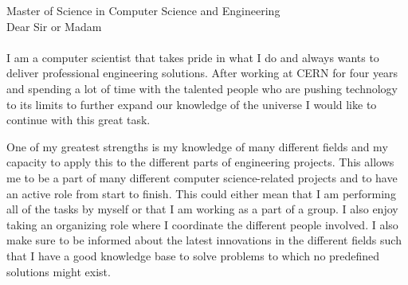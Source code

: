 \documentclass[left=2.5cm,top=2cm,right=2.5cm,bottom=2.5cm]{cv-style}
\begin{document}
       {Master of Science in Computer Science and Engineering}        %
\vspace{10mm}
\\
Dear Sir or Madam
\\
\\
I am a computer scientist that takes pride in what I do and always wants to deliver professional engineering solutions. After working at CERN for four years and spending a lot of time with the talented people who are pushing technology to its limits to further expand our knowledge of the universe I would like to continue with this great task.

One of my greatest strengths is my knowledge of many different fields and my capacity to apply this to the different parts of engineering projects. This allows me to be a part of many different computer science-related projects and to have an active role from start to finish. This could either mean that I am performing all of the tasks by myself or that I am working as a part of a group. I also enjoy taking an organizing role where I coordinate the different people involved. I also make sure to be informed about the latest innovations in the different fields such that I have a good knowledge base to solve problems to which no predefined solutions might exist.
\end{document}
